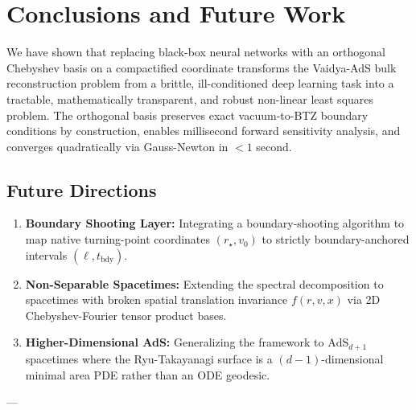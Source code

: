\documentclass[11pt,a4paper]{article}
\begin{document}
\vspace{0.8em}

\section{Conclusions and Future Work}

We have shown that replacing black-box neural networks with an orthogonal Chebyshev basis on a compactified coordinate transforms the Vaidya-AdS bulk reconstruction problem from a brittle, ill-conditioned deep learning task into a tractable, mathematically transparent, and robust non-linear least squares problem. The orthogonal basis preserves exact vacuum-to-BTZ boundary conditions by construction, enables millisecond forward sensitivity analysis, and converges quadratically via Gauss-Newton in $< 1$ second.

\subsection{Future Directions}
\begin{enumerate}
    \item \textbf{Boundary Shooting Layer:} Integrating a boundary-shooting algorithm to map native turning-point coordinates $(r_\star, v_0)$ to strictly boundary-anchored intervals $(\ell, t_{\mathrm{bdy}})$.
    \item \textbf{Non-Separable Spacetimes:} Extending the spectral decomposition to spacetimes with broken spatial translation invariance $f(r, v, x)$ via 2D Chebyshev-Fourier tensor product bases.
    \item \textbf{Higher-Dimensional AdS:} Generalizing the framework to $\mathrm{AdS}_{d+1}$ spacetimes where the Ryu-Takayanagi surface is a $(d-1)$-dimensional minimal area PDE rather than an ODE geodesic.
\end{enumerate}

---
\end{document}
